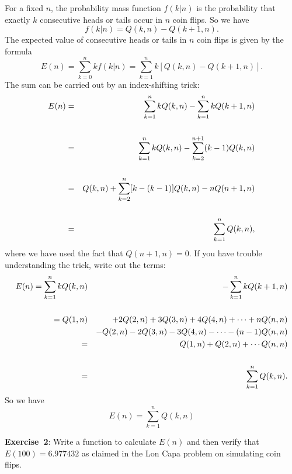\documentclass[11pt]{article}
\newcommand{\beq}{\begin{equation}}
\newcommand{\eeq}{\end{equation}}
\newcommand{\beqn}{\begin{eqnarray}}
\newcommand{\eeqn}{\end{eqnarray}}
\begin{document}
For a fixed $n$, the probability mass function $f(k|n)$ is the probability that exactly 
$k$ consecutive heads or tails occur in $n$ coin flips. So we have 
\beq
  f(k|n) = Q(k,n)-Q(k+1,n) .
\eeq
The expected value of consecutive heads or tails in $n$ coin flips is given by the formula 
\beq
  E(n) = \sum_{k=0}^n k f(k|n) = \sum_{k=1}^n k [Q(k,n)-Q(k+1,n)] .
\eeq
The sum can be carried out by an index-shifting trick:
\beqn
  E(n) &=& \sum_{k=1}^n k Q(k,n) - \sum_{k=1}^n k Q(k+1,n) \cr \cr 
 &=& \sum_{k=1}^n k Q(k,n) -\sum_{k=2}^{n+1} (k-1) Q(k,n) \cr \cr 
 &=& Q(k,n) + \sum_{k=2}^n [k-(k-1)]Q(k,n) - nQ(n+1,n) \cr \cr 
 &=& \sum_{k=1}^n Q(k,n) ,
\label{eq:En}
\eeqn
where we have used the fact that $Q(n+1,n)=0$. If you have trouble understanding the trick, write out 
the terms:
\beqn
  E(n)= \sum_{k=1}^n k Q(k,n) &&- \sum_{k=1}^n k Q(k+1,n) \cr \cr 
     = Q(1,n) && + 2Q(2,n) + 3Q(3,n)+4Q(4,n)+\cdots + nQ(n,n) \cr 
   &&-Q(2,n)-2Q(3,n)-3Q(4,n)-\cdots -(n-1)Q(n,n) \cr 
  = && Q(1,n) + Q(2,n) + \cdots Q(n,n) \cr \cr
 =&& \sum_{k=1}^n Q(k,n) .
\eeqn
So we have 
\beq
 \boxed{ E(n)=\sum_{k=1}^n Q(k,n) }
\eeq

\vskip 1cm
{\bf Exercise~2}: Write a function to calculate $E(n)$ and then verify that $E(100)=6.977432$ as claimed 
in the Lon Capa problem on simulating coin flips.
\end{document}
